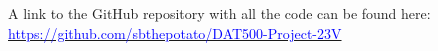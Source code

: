 
A link to the GitHub repository with all the code can be found here: \href{https://github.com/sbthepotato/DAT500-Project-23V}{\textcolor{blue}{https://github.com/sbthepotato/DAT500-Project-23V}}

